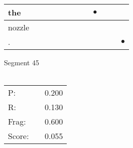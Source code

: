 \documentclass[landscape]{article}
\newcommand{\ssp}{\hspace{2pt}}
\newcommand{\mex}{\cellcolor{g}$\bullet$}
\begin{document}
\begin{tabular}{|l|p{10pt}|p{10pt}|p{10pt}|p{10pt}|p{10pt}|p{10pt}|p{10pt}|p{10pt}|p{10pt}|p{10pt}|p{10pt}|}
\hline
\ssp \cellcolor{ref7}the \ssp&\hspace{2pt}&\hspace{2pt}&\hspace{2pt}&\hspace{2pt}&\hspace{2pt}&\hspace{2pt}&\hspace{2pt}&\hspace{2pt}\mex&\hspace{2pt}&\hspace{2pt}&\hspace{2pt}\\
\hline
\ssp nozzle \ssp&\hspace{2pt}&\hspace{2pt}&\hspace{2pt}&\hspace{2pt}&\hspace{2pt}&\hspace{2pt}&\hspace{2pt}&\hspace{2pt}&\hspace{2pt}&\hspace{2pt}&\hspace{2pt}\\
\hline
\ssp \cellcolor{ref10}. \ssp&\hspace{2pt}&\hspace{2pt}&\hspace{2pt}&\hspace{2pt}&\hspace{2pt}&\hspace{2pt}&\hspace{2pt}&\hspace{2pt}&\hspace{2pt}&\hspace{2pt}&\hspace{2pt}\mex\\
\hline
\end{tabular}

\vspace{6pt}
\noindent Segment 45\\\\
\noindent\begin{tabular}{lm{12pt}r}
\hline
P:&&0.200\\
R:&&0.130\\
Frag:&&0.600\\
Score:&&0.055\\
\end{tabular}
\end{document}
